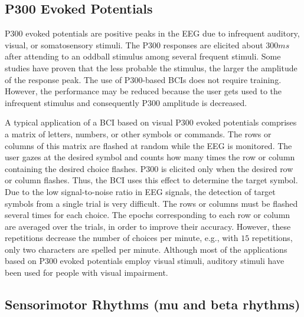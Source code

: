 \subsection{P300 Evoked Potentials}\label{ch2:5}

P300 evoked potentials are positive peaks in the EEG due to infrequent auditory, visual, or somatosensory stimuli. The P300 responses are elicited about $300 ms$ after attending to an oddball stimulus among several frequent stimuli. Some studies have proven that the less probable the stimulus, the larger the amplitude of the response peak. The use of P300-based BCIs does not require training. However, the performance may be reduced because the user gets used to the infrequent stimulus and consequently P300 amplitude is decreased.

A typical application of a BCI based on visual P300 evoked potentials comprises a matrix of letters, numbers, or other symbols or commands. The rows or columns of this matrix are flashed at random while the EEG is monitored. The user gazes at the desired symbol and counts how many times the row or column containing the desired choice flashes. P300 is elicited only when the desired row or column flashes. Thus, the BCI uses this effect to determine the target symbol. Due to the low signal-to-noise ratio in EEG signals, the detection of target symbols from a single trial is very difficult. The rows or columns must be flashed several times for each choice. The epochs corresponding to each row or column are averaged over the trials, in order to improve their accuracy. However, these repetitions decrease the number of choices per minute, e.g., with $15$ repetitions, only two characters are spelled per minute. Although most of the applications based on P300 evoked potentials employ visual stimuli, auditory stimuli have been used for people with visual impairment.

\subsection{Sensorimotor Rhythms (mu and beta rhythms)}\label{ch2:5}

